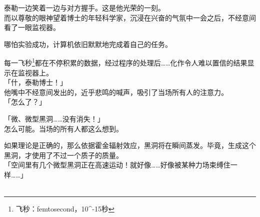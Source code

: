 泰勒一边笑着一边与对方握手。这是他光荣的一刻。\\

而以尊敬的眼神望着博士的年轻科学家，沉浸在兴奋的气氛中一会之后，不经意间看了一眼监视器。

哪怕实验成功，计算机依旧默默地完成着自己的任务。

每一飞秒\footnote{飞秒：femtosecond，10^-15秒}都在不停积累的数据，经过程序的处理后……化作令人难以置信的结果显示在监视器上。\\

「什，泰勒博士！」\\

他嘴中不经意间发出的，近乎悲鸣的喊声，吸引了当场所有人的注意力。\\

「怎么了？」

「微、微型黑洞……没有消失！」\\

怎么可能。当场的所有人都这么想到。

如果理论是正确的，那么依据霍金辐射效应，黑洞将在瞬间蒸发。毕竟，生成这个黑洞，才使用了不过一个质子的质量。\\

「空间里有几个微型黑洞正在高速运动！就好像……好像被某种力场束缚住一样……」\\

\sqsplit\\

